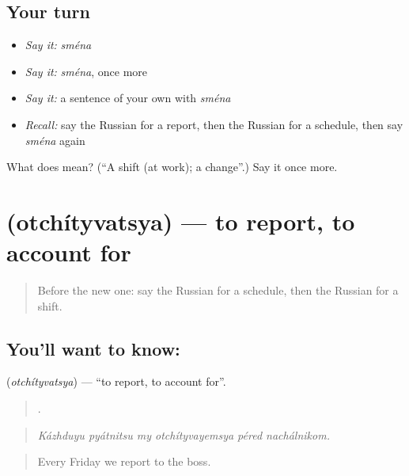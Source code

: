 \subsection*{Your turn}
\begin{itemize}
\raggedright
  \item \emph{Say it:} \emph{sména}
  \item \emph{Say it:} \emph{sména}, once more
  \item \emph{Say it:} a sentence of your own with \emph{sména}
  \item \emph{Recall:} say the Russian for a report, then the Russian for a schedule, then say \emph{sména} again
\end{itemize}

\begin{tcolorbox}[breakable,colback=teal!4,colframe=teal!35!black,title={Before you move on}]
What does  mean? (\textquotedblleft{}A shift (at work); a change\textquotedblright{}.) Say it once more.
\end{tcolorbox}
\section[\texorpdfstring{\ru{отчитываться} (otchítyvatsya)}{отчитываться (otchítyvatsya)}]{ (otchítyvatsya) — to report, to account for}

\label{lesson:RU-C360-otchityvatsya}



\begin{quote}
Before the new one: say the Russian for a schedule, then the Russian for a shift.
\end{quote}

\subsection*{You'll want to know: }
\textbf{} (\emph{otchítyvatsya}) — \textquotedblleft{}to report, to account for\textquotedblright{}.

\begin{quote}
     .
\end{quote}

\begin{quote}
\emph{Kázhduyu pyátnitsu my otchítyvayemsya péred nachálnikom.}
\end{quote}

\begin{quote}
Every Friday we report to the boss.
\end{quote}

